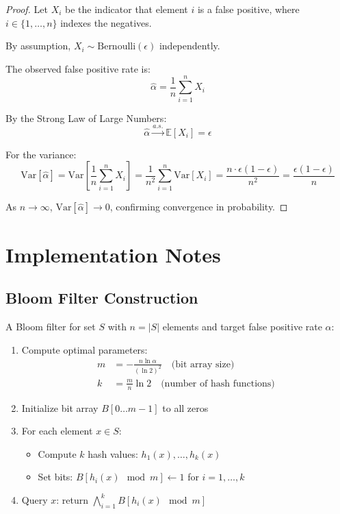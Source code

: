 \documentclass[11pt]{article}
\newcommand{\expect}[1]{\mathbb{E}\left[#1\right]}
\newcommand{\var}[1]{\text{Var}\left[#1\right]}
\newcommand{\card}[1]{|#1|}
\newcommand{\fprate}{\alpha}  %
\begin{document}
\begin{proof}
Let $X_i$ be the indicator that element $i$ is a false positive, where $i \in \{1, \ldots, n\}$ indexes the negatives.

By assumption, $X_i \sim \text{Bernoulli}(\epsilon)$ independently.

The observed false positive rate is:
$$\hat{\fprate} = \frac{1}{n} \sum_{i=1}^n X_i$$

By the Strong Law of Large Numbers:
$$\hat{\fprate} \xrightarrow{a.s.} \expect{X_i} = \epsilon$$

For the variance:
$$\var{\hat{\fprate}} = \var{\frac{1}{n} \sum_{i=1}^n X_i} = \frac{1}{n^2} \sum_{i=1}^n \var{X_i} = \frac{n \cdot \epsilon(1-\epsilon)}{n^2} = \frac{\epsilon(1-\epsilon)}{n}$$

As $n \to \infty$, $\var{\hat{\fprate}} \to 0$, confirming convergence in probability.
\end{proof}

\section{Implementation Notes}
\label{app:implementation}

\subsection{Bloom Filter Construction}

A Bloom filter for set $S$ with $n = \card{S}$ elements and target false positive rate $\fprate$:

\begin{enumerate}
\item Compute optimal parameters:
\begin{align}
m &= -\frac{n \ln \fprate}{(\ln 2)^2} \quad \text{(bit array size)} \\
k &= \frac{m}{n} \ln 2 \quad \text{(number of hash functions)}
\end{align}

\item Initialize bit array $B[0 \ldots m-1]$ to all zeros

\item For each element $x \in S$:
\begin{itemize}
\item Compute $k$ hash values: $h_1(x), \ldots, h_k(x)$
\item Set bits: $B[h_i(x) \mod m] \leftarrow 1$ for $i = 1, \ldots, k$
\end{itemize}

\item Query $x$: return $\bigwedge_{i=1}^k B[h_i(x) \mod m]$
\end{enumerate}
\end{document}
